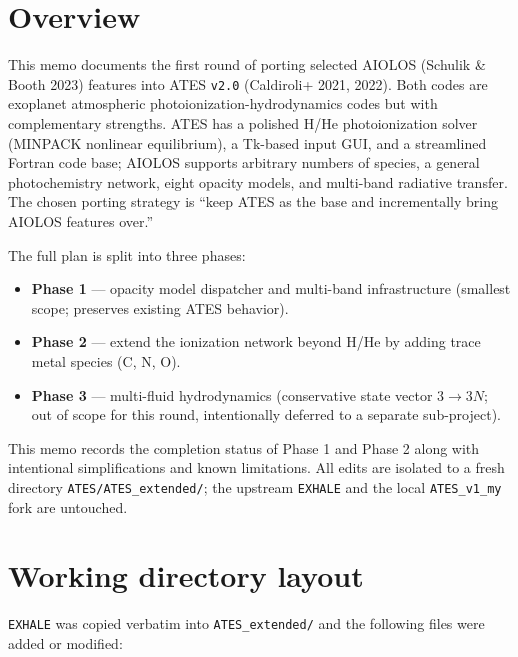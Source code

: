 \documentclass[english,a4paper]{my_memo}
\begin{document}
\section{Overview}

This memo documents the first round of porting selected AIOLOS (Schulik \& Booth 2023)
features into ATES \texttt{v2.0} (Caldiroli+ 2021, 2022). Both codes are exoplanet
atmospheric photoionization-hydrodynamics codes but with complementary strengths.
ATES has a polished H/He photoionization solver (MINPACK nonlinear equilibrium),
a Tk-based input GUI, and a streamlined Fortran code base; AIOLOS supports
arbitrary numbers of species, a general photochemistry network, eight opacity
models, and multi-band radiative transfer. The chosen porting strategy is
``keep ATES as the base and incrementally bring AIOLOS features over.''

The full plan is split into three phases:
\begin{itemize}
\item \textbf{Phase 1} --- opacity model dispatcher and multi-band infrastructure
(smallest scope; preserves existing ATES behavior).
\item \textbf{Phase 2} --- extend the ionization network beyond H/He by adding
trace metal species (C, N, O).
\item \textbf{Phase 3} --- multi-fluid hydrodynamics (conservative state vector
$3 \to 3N$; out of scope for this round, intentionally deferred to a separate
sub-project).
\end{itemize}

This memo records the completion status of Phase 1 and Phase 2 along with
intentional simplifications and known limitations. All edits are isolated to a
fresh directory \texttt{ATES/ATES\_extended/}; the upstream
\texttt{EXHALE} and the local \texttt{ATES\_v1\_my} fork are untouched.

\section{Working directory layout}

\texttt{EXHALE} was copied verbatim into \texttt{ATES\_extended/} and
the following files were added or modified:
\end{document}
